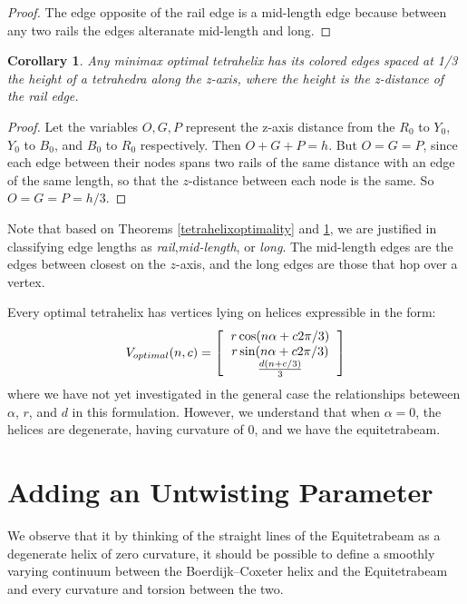 \documentclass[11pt]{article}
\newtheorem{corollary}{Corollary}
\begin{document}
\begin{proof}
The edge opposite of the rail edge is a mid-length edge because between any two rails the edges alteranate mid-length and long.
\end{proof}

\begin{corollary}
  \label{eventhirds}
  Any minimax optimal tetrahelix has its colored edges spaced at 1/3 the height of
  a tetrahedra along the z-axis, where the height is the z-distance of the rail edge.
  \end{corollary}

\begin{proof}
  Let the variables $O,G,P$ represent the z-axis distance from the
  $R_0$ to $Y_0$, $Y_0$ to $B_0$, and
  $B_0$ to $R_0$ respectively. Then $O+G+P = h$. But $O=G=P$, since each edge between
  their nodes spans two rails of the same distance with an edge of the same length,
  so that the $z$-distance between each node is the same. So $O=G=P=h/3$.
\end{proof}

Note that based on Theorems \ref{tetrahelixoptimality} and \ref{eventhirds}, we are justified in classifying edge lengths as \emph{rail},\emph{mid-length}, or
\emph{long}. The mid-length edges are the edges between closest on the $z$-axis, and the long edges are those that hop over a vertex.

Every optimal tetrahelix has vertices lying on helices expressible in the form:
\[
V_{optimal}(n,c) =
\left [
  \begin{tabular}{c}
   $ r \cos(n \alpha +  c 2 \pi /3)$\\
   $ r \sin(n \alpha +  c 2 \pi /3) $\\
   $ \frac{d(n +c / 3)}{3}   $
  \end{tabular}
\right ]
\]
where we have not yet investigated in the general case the relationships beteween $\alpha$, $r$, and $d$ in this formulation.
However, we understand that when $\alpha = 0$, the helices are degenerate, having curvature of $0$, and
we have the equitetrabeam.






\section{Adding an Untwisting Parameter}

We observe that it by thinking of the straight lines of the Equitetrabeam as a degenerate helix of zero curvature,
it should be possible to define a smoothly varying continuum between the Boerdijk--Coxeter helix and the Equitetrabeam and every
curvature and torsion between the two.
\end{document}
